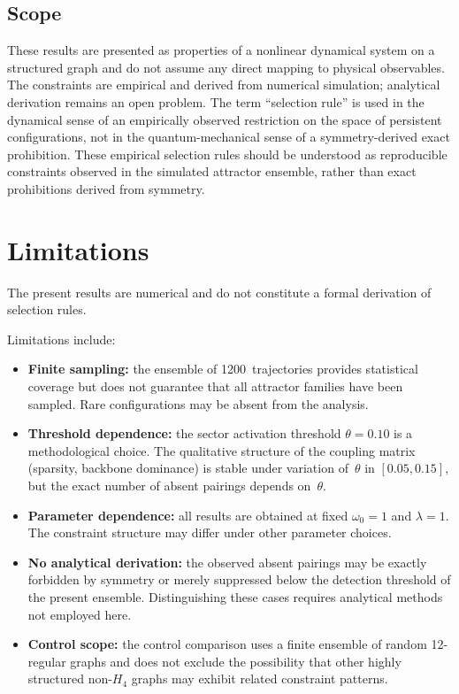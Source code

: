 \documentclass[12pt,a4paper]{article}
\newcommand{\Hfour}{H_4}
\begin{document}
\subsection{Scope}

These results are presented as properties of a nonlinear dynamical
system on a structured graph and do not assume any direct mapping to
physical observables.  The constraints are empirical and derived from
numerical simulation; analytical derivation remains an open problem.
The term ``selection rule'' is used in the dynamical sense of an
empirically observed restriction on the space of persistent
configurations, not in the quantum-mechanical sense of a
symmetry-derived exact prohibition.  These empirical selection rules
should be understood as reproducible constraints observed in the
simulated attractor ensemble, rather than exact prohibitions derived
from symmetry.


\section{Limitations}\label{sec:limitations}

The present results are numerical and do not constitute a formal
derivation of selection rules.

Limitations include:
\begin{itemize}[nosep]
\item \textbf{Finite sampling:} the ensemble of 1200~trajectories
  provides statistical coverage but does not guarantee that all
  attractor families have been sampled.  Rare configurations may
  be absent from the analysis.
\item \textbf{Threshold dependence:} the sector activation threshold
  $\theta = 0.10$ is a methodological choice.  The qualitative
  structure of the coupling matrix (sparsity, backbone dominance) is
  stable under variation of~$\theta$ in $[0.05, 0.15]$, but the
  exact number of absent pairings depends on~$\theta$.
\item \textbf{Parameter dependence:} all results are obtained at
  fixed $\omega_0 = 1$ and $\lambda = 1$.  The constraint structure
  may differ under other parameter choices.
\item \textbf{No analytical derivation:} the observed absent pairings
  may be exactly forbidden by symmetry or merely suppressed below the
  detection threshold of the present ensemble.  Distinguishing these
  cases requires analytical methods not employed here.
\item \textbf{Control scope:} the control comparison uses a finite
  ensemble of random 12-regular graphs and does not exclude the
  possibility that other highly structured non-$\Hfour$ graphs may
  exhibit related constraint patterns.
\end{itemize}
\end{document}
